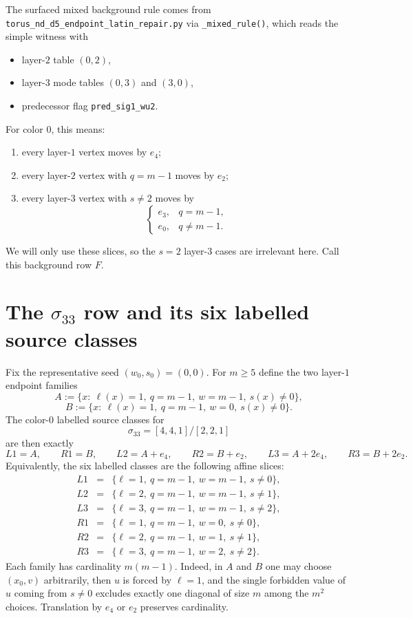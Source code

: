 \documentclass[11pt]{article}
\newcommand{\eX}{e_0}
\newcommand{\eW}{e_2}
\newcommand{\eV}{e_3}
\newcommand{\eU}{e_4}
\begin{document}
The surfaced mixed background rule comes from
\texttt{torus\_nd\_d5\_endpoint\_latin\_repair.py} via
\texttt{\_mixed\_rule()}, which reads the simple witness with
\begin{itemize}
\item layer-$2$ table $(0,2)$,
\item layer-$3$ mode tables $(0,3)$ and $(3,0)$,
\item predecessor flag \texttt{pred\_sig1\_wu2}.
\end{itemize}
For color $0$, this means:
\begin{enumerate}
\item every layer-$1$ vertex moves by $\eU$;
\item every layer-$2$ vertex with $q=m-1$ moves by $\eW$;
\item every layer-$3$ vertex with $s\neq 2$ moves by
\[
\begin{cases}
\eV, & q=m-1,\\
\eX, & q\neq m-1.
\end{cases}
\]
\end{enumerate}
We will only use these slices, so the $s=2$ layer-$3$ cases are irrelevant here.
Call this background row $F$.

\section*{The $\sigma_{33}$ row and its six labelled source classes}

Fix the representative seed $(w_0,s_0)=(0,0)$.
For $m\ge 5$ define the two layer-$1$ endpoint families
\[
A:=\{x:\ \ell(x)=1,\ q=m-1,\ w=m-1,\ s(x)\neq 0\},
\]
\[
B:=\{x:\ \ell(x)=1,\ q=m-1,\ w=0,\ s(x)\neq 0\}.
\]
The color-$0$ labelled source classes for
\[
\sigma_{33}=[4,4,1]/[2,2,1]
\]
are then exactly
\[
L1=A,
\qquad
R1=B,
\qquad
L2=A+\eU,
\qquad
R2=B+\eW,
\qquad
L3=A+2\eU,
\qquad
R3=B+2\eW.
\]
Equivalently, the six labelled classes are the following affine slices:
\[
\begin{array}{rcl}
L1&=&\{\ell=1,\ q=m-1,\ w=m-1,\ s\neq 0\},\\
L2&=&\{\ell=2,\ q=m-1,\ w=m-1,\ s\neq 1\},\\
L3&=&\{\ell=3,\ q=m-1,\ w=m-1,\ s\neq 2\},\\
R1&=&\{\ell=1,\ q=m-1,\ w=0,\ s\neq 0\},\\
R2&=&\{\ell=2,\ q=m-1,\ w=1,\ s\neq 1\},\\
R3&=&\{\ell=3,\ q=m-1,\ w=2,\ s\neq 2\}.
\end{array}
\]
Each family has cardinality $m(m-1)$.
Indeed, in $A$ and $B$ one may choose $(x_0,v)$ arbitrarily, then $u$ is forced by
$\ell=1$, and the single forbidden value of $u$ coming from $s\neq 0$ excludes
exactly one diagonal of size $m$ among the $m^2$ choices.
Translation by $\eU$ or $\eW$ preserves cardinality.
\end{document}
